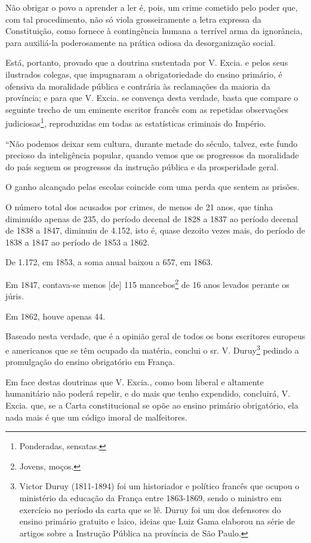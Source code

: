 Não obrigar o povo a aprender a ler é, pois, um crime cometido pelo
poder que, com tal procedimento, não só viola grosseiramente a letra
expressa da Constituição, como fornece à contingência humana a terrível
arma da ignorância, para auxiliá-la poderosamente na prática odiosa da
desorganização social.

Está, portanto, provado que a doutrina sustentada por V. Excia. e pelos
seus ilustrados colegas, que impugnaram a obrigatoriedade do ensino
primário, é ofensiva da moralidade pública e contrária às reclamações da
maioria da província; e para que V. Excia. se convença desta verdade,
basta que compare o seguinte trecho de um eminente escritor francês com
as repetidas observações judiciosas\footnote{Ponderadas, sensatas.},
reproduzidas em todas as estatísticas criminais do Império.

``Não podemos deixar sem cultura, durante metade do século, talvez, este
fundo precioso da inteligência popular, quando vemos que os progressos
da moralidade do país seguem os progressos da instrução pública e da
prosperidade geral.

O ganho alcançado pelas escolas coincide com uma perda que sentem as
prisões.

O número total dos acusados por crimes, de menos de 21 anos, que tinha
diminuído apenas de 235, do período decenal de 1828 a 1837 ao período
decenal de 1838 a 1847, diminuiu de 4.152, isto é, quase dezoito vezes
mais, do período de 1838 a 1847 ao período de 1853 a 1862.

De 1.172, em 1853, a soma anual baixou a 657, em 1863.

Em 1847, contava-se menos {[}de{]} 115 mancebos\footnote{Jovens,
  moços.} de 16 anos levados perante os júris.

Em 1862, houve apenas 44.

Baseado nesta verdade, que é a opinião geral de todos os bons escritores
europeus e americanos que se têm ocupado da matéria, conclui o sr. V.
Duruy\footnote{Victor Duruy (1811-1894) foi um historiador e político
  francês que ocupou o ministério da educação da França entre 1863-1869,
  sendo o ministro em exercício no período da carta que se lê. Duruy foi
  um dos defensores do ensino primário gratuito e laico, ideias que Luiz
  Gama elaborou na série de artigos sobre a Instrução Pública na
  província de São Paulo.} pedindo a promulgação do ensino obrigatório
em França.

Em face destas doutrinas que V. Excia., como bom liberal e altamente
humanitário não poderá repelir, e do mais que tenho expendido,
concluirá, V. Excia. que, se a Carta constitucional se opõe ao ensino
primário obrigatório, ela nada mais é que um código imoral de
malfeitores.

